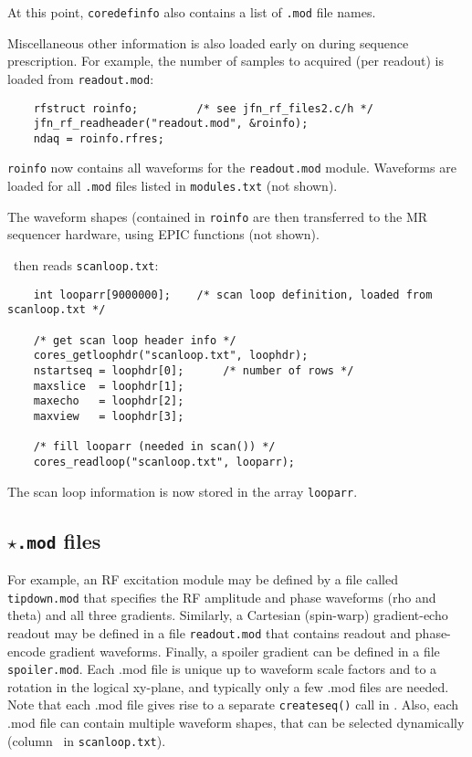 At this point, {\tt coredefinfo} also contains a list of {\tt .mod} file names.

Miscellaneous other information is also loaded early on during sequence prescription. 
For example, the number of samples to acquired (per readout) is loaded from {\tt readout.mod}:

\begin{lstlisting}
	rfstruct roinfo;         /* see jfn_rf_files2.c/h */
	jfn_rf_readheader("readout.mod", &roinfo);
	ndaq = roinfo.rfres;
\end{lstlisting}


{\tt roinfo} now contains all waveforms for the {\tt readout.mod} module.
Waveforms are loaded for all {\tt .mod} files listed in {\tt modules.txt} (not shown).

The waveform shapes (contained in {\tt roinfo} are then transferred to the MR sequencer hardware, using EPIC functions (not shown).



\toppe~then reads {\tt scanloop.txt}:

\begin{lstlisting}
	int looparr[9000000];    /* scan loop definition, loaded from scanloop.txt */

	/* get scan loop header info */
	cores_getloophdr("scanloop.txt", loophdr);
	nstartseq = loophdr[0];      /* number of rows */
	maxslice  = loophdr[1];
	maxecho   = loophdr[2];
	maxview   = loophdr[3];

	/* fill looparr (needed in scan()) */
	cores_readloop("scanloop.txt", looparr);
\end{lstlisting}

The scan loop information is now stored in the array {\tt looparr}.



\subsection{ {\tt $\star$.mod} files}
For example, an RF excitation module may be defined by a file called {\tt tipdown.mod} that specifies the RF amplitude and phase waveforms (rho and theta) and all three gradients.
Similarly, a Cartesian (spin-warp) gradient-echo readout may be defined in a file {\tt readout.mod} that contains readout and phase-encode gradient waveforms.
Finally, a spoiler gradient can be defined in a file {\tt spoiler.mod}.
Each .mod file is unique up to waveform scale factors and to a rotation in the logical xy-plane, and typically only a few .mod files are needed.
Note that each .mod file gives rise to a separate {\tt createseq()} call in \toppe.
Also, each .mod file can contain multiple waveform shapes, that can be selected dynamically (column \waveformnum~in {\tt scanloop.txt}).


